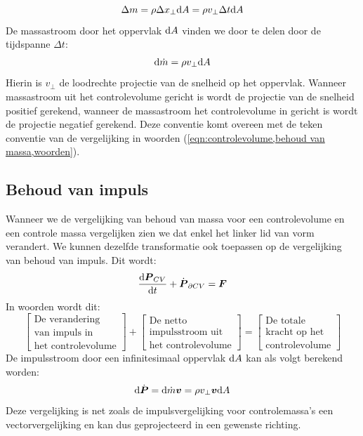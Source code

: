 \begin{equation}
	\Delta m = \rho \Delta x_{\perp} \mathrm{d} A = \rho v_{\perp} \Delta t \mathrm{d} A
	\label{eqn:hoeveelheid massa door een oppervlak}
\end{equation}
De massastroom door het oppervlak $\mathrm{d} A$ vinden we door te delen door de tijdspanne $\Delta t$:
\begin{equation}
	\mathrm{d} \dot{m}  = \rho v_{\perp} \mathrm{d} A
	\label{eqn:massastroom}
\end{equation}
Hierin is $v_{\perp}$ de loodrechte projectie van de snelheid op het oppervlak. Wanneer massastroom uit het controlevolume gericht is wordt de projectie van de snelheid positief gerekend, wanneer de massastroom het controlevolume in gericht is wordt de projectie negatief gerekend. Deze conventie komt overeen met de teken conventie van de vergelijking in woorden (\ref{eqn:controlevolume,behoud van massa,woorden}).

			\subsection{Behoud van impuls}
			\label{sec:Behoud van impuls}
Wanneer we de vergelijking van behoud van massa voor een controlevolume en een controle massa vergelijken zien we dat enkel het linker lid van vorm verandert. We kunnen dezelfde transformatie ook toepassen op de vergelijking van behoud van impuls. Dit wordt:
\begin{equation}
	\frac{\mathrm{d} \boldsymbol{P}_{CV}}{\mathrm{d} t} + \dot{\boldsymbol{P}}_{\partial CV} =  \boldsymbol{F}
	\label{eqn:controlevolume,behoud van impuls}
\end{equation}
In woorden wordt dit:
\begin{equation}
	\left[
		\begin{array}{c}
			\mbox{De verandering} \\ \mbox{van impuls in} \\ \mbox{het controlevolume}
		\end{array}
	\right]
	+
	\left[
		\begin{array}{c}
			\mbox{De netto} \\ \mbox{impulsstroom uit} \\ \mbox{het controlevolume}
		\end{array}
	\right]
	=
	\left[
		\begin{array}{c}
			\mbox{De totale} \\ \mbox{kracht op het} \\ \mbox{controlevolume}
		\end{array}
	\right]
	\label{eqn:controlevolume,behoud van impuls,woorden}
\end{equation}
De impulsstroom door een infinitesimaal oppervlak $\mathrm{d} A$ kan als volgt berekend worden:
\begin{equation}
	\mathrm{d} \dot{\boldsymbol{P}} =  \mathrm{d} \dot{m} \boldsymbol{v} = \rho v_{\perp} \boldsymbol{v} \mathrm{d} A
	\label{eqn:impulsstroom}
\end{equation}
Deze vergelijking is net zoals de impulsvergelijking voor controlemassa's een vectorvergelijking en kan dus geprojecteerd in een gewenste richting.

